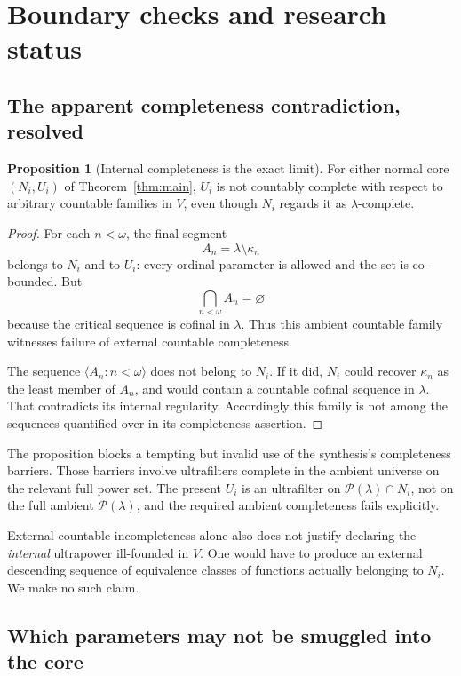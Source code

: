 \documentclass[11pt,letterpaper]{article}
\theoremstyle{definition}
\newtheorem{proposition}[definition]{Proposition}
\newcommand{\Pow}{\mathcal P}
\newcommand{\seq}[1]{\langle #1\rangle}
\begin{document}
\section{Boundary checks and research status}\label{sec:audit}

\subsection{The apparent completeness contradiction, resolved}

\begin{proposition}[Internal completeness is the exact limit]\label{prop:external}
For either normal core $(N_i,U_i)$ of Theorem~\ref{thm:main}, $U_i$ is not countably complete with respect to arbitrary countable families in $V$, even though $N_i$ regards it as $\lambda$-complete.
\end{proposition}

\begin{proof}
For each $n<\omega$, the final segment
\[
                            A_n=\lambda\setminus\kappa_n
\]
belongs to $N_i$ and to $U_i$: every ordinal parameter is allowed and the set is co-bounded. But
\[
                              \bigcap_{n<\omega}A_n=\varnothing
\]
because the critical sequence is cofinal in $\lambda$. Thus this ambient countable family witnesses failure of external countable completeness.

The sequence $\seq{A_n:n<\omega}$ does not belong to $N_i$. If it did, $N_i$ could recover $\kappa_n$ as the least member of $A_n$, and would contain a countable cofinal sequence in $\lambda$. That contradicts its internal regularity. Accordingly this family is not among the sequences quantified over in its completeness assertion.
\end{proof}

The proposition blocks a tempting but invalid use of the synthesis's completeness barriers. Those barriers involve ultrafilters complete in the ambient universe on the relevant full power set. The present $U_i$ is an ultrafilter on $\Pow(\lambda)\cap N_i$, not on the full ambient $\Pow(\lambda)$, and the required ambient completeness fails explicitly.

External countable incompleteness alone also does not justify declaring the \emph{internal} ultrapower ill-founded in $V$. One would have to produce an external descending sequence of equivalence classes of functions actually belonging to $N_i$. We make no such claim.

\subsection{Which parameters may not be smuggled into the core}
\end{document}
